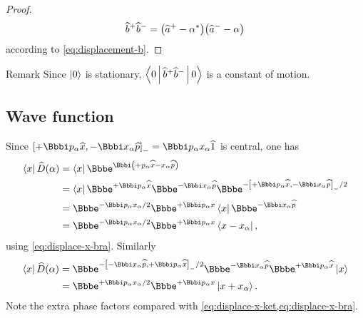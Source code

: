 \begin{proof}
\begin{equation}
\widehat{b}^+ \widehat{b}^- =
{\left(\widehat{a}^+ - \alpha^*\right)}{\left(\widehat{a}^- - \alpha\right)}
\end{equation}
according to \ref{eq:displacement-b}.
\end{proof}

\begin{namedrem}{Remark}
Since $\Ket{0}$ is stationary, $\Braket{0 | \widehat{b}^+ \widehat{b}^- | 0}$
is a constant of motion.

\end{namedrem}

\subsection{Wave function}
Since $\sbr{+\ii p_\alpha\widehat{x}, -\ii x_\alpha\widehat{p}}_- =
\ii p_\alpha x_\alpha \widehat{1}$ is central, one has
\begin{align}
\Bra{x}\rfun{\widehat{D}}{\alpha}
&= \Bra{x}\ee^{\ii\rbr{+p_\alpha\widehat{x}-x_\alpha\widehat{p}}}
\nonumber\\
&= \Bra{x}\ee^{+\ii p_\alpha\widehat{x}}\ee^{-\ii x_\alpha\widehat{p}}
\ee^{-\sbr{+\ii p_\alpha\widehat{x}, -\ii x_\alpha\widehat{p}}_-/2}
\nonumber \\
&= \ee^{-\ii p_\alpha x_\alpha/2} \ee^{+\ii p_\alpha x}
\Bra{x} \ee^{-\ii x_\alpha\widehat{p}}
\nonumber \\
&= \ee^{-\ii p_\alpha x_\alpha/2} \ee^{+\ii p_\alpha x}
\Bra{x-x_\alpha},
\label{eq:displacement-x-bra}
\end{align}
using \cref{eq:displace-x-bra}. Similarly
\begin{align}
\Bra{x}\rfun{\widehat{D}}{\alpha}
&= \ee^{-\sbr{-\ii x_\alpha\widehat{p}, +\ii p_\alpha\widehat{x}}_-/2}
\ee^{-\ii x_\alpha\widehat{p}}\ee^{+\ii p_\alpha\widehat{x}} \Ket{x}
\nonumber \\
&= \ee^{+\ii p_\alpha x_\alpha/2} \ee^{+\ii p_\alpha x} \Ket{x+x_\alpha}.
\end{align}
Note the extra phase factors compared with
\cref{eq:displace-x-ket,eq:displace-x-bra}.


